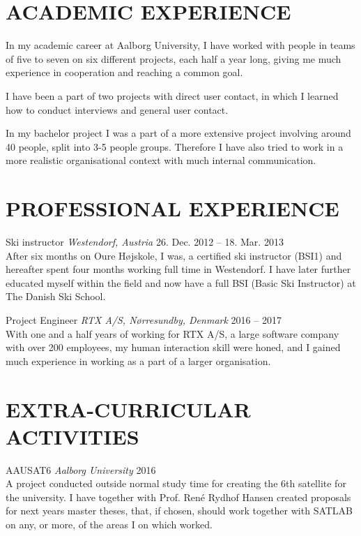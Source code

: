 \documentclass[margin, 10pt]{res} %
\begin{document}
\begin{resume}
\section{ACADEMIC EXPERIENCE}

In my academic career at Aalborg University, I have worked with people in teams of five to seven on six different projects, each half a year long, giving me much experience in cooperation and reaching a common goal.

I have been a part of two projects with direct user contact, in which I learned how to conduct interviews and general user contact.

In my bachelor project I was a part of a more extensive project involving around 40 people, split into 3-5 people groups. Therefore I have also tried to work in a more realistic organisational context with much internal communication. 

\section{PROFESSIONAL EXPERIENCE}

Ski instructor {\it Westendorf, Austria} \hfill 26. Dec. 2012 -- 18. Mar. 2013 \\
After six months on Oure Højskole, I was, a certified ski instructor (BSI1) and hereafter spent four months working full time in Westendorf. I have later further educated myself within the field and now have a full BSI (Basic Ski Instructor) at The Danish Ski School.

Project Engineer {\it RTX A/S, Nørresundby, Denmark} \hfill 2016 -- 2017 \\
With one and a half years of working for RTX A/S, a large software company with over 200 employees, my human interaction skill were honed, and I gained much experience in working as a part of a larger organisation.


\section{EXTRA-CURRICULAR ACTIVITIES} 

AAUSAT6 {\it Aalborg University} \hfill 2016 \\ 
A project conducted outside normal study time for creating the 6th satellite for the university.
I have together with Prof. René Rydhof Hansen created proposals for next years master theses, that, if chosen, should work together with SATLAB on any, or more, of the areas I on which worked.


\end{resume}
\end{document}
